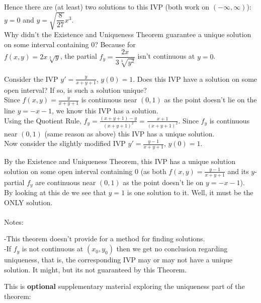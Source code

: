 \documentclass{ximera}
\begin{document}
 Hence there are (at least) two solutions to this IVP (both work on $(-\infty,\infty)$):\\ 
 $y=0$ and $\displaystyle y=\sqrt{\dfrac{8}{27}}x^{3}.$\\


 Why didn't the Existence and Uniqueness Theorem guarantee a unique solution on some interval containing $0$?  Because for\\ $f(x,y)=2x\sqrt[3]{y}$, the partial $f_{y}=\dfrac{2x}{3\sqrt[3]{y^{2}}}$ isn't continuous at $y=0$.


 Consider the IVP $\displaystyle y'=\frac{y}{x+y+1}$, $y(0)=1$.   Does this IVP have a solution on some open interval?  If so, is such a solution unique?\\

 Since $\displaystyle f(x,y)=\frac{y}{x+y+1}$ is continuous near $(0,1)$  as the point doesn't lie on the line $y=-x-1$,  we know this IVP has a solution.\\

 Using the Quotient Rule, $\displaystyle f_y=\frac{(x+y+1)-y}{(x+y+1)^2}=\frac{x+1}{(x+y+1)^2}$.   Since $f_y$ is continuous near $(0,1)$ (same reason as above)  this IVP has a unique solution.\\


 Now consider the slightly modified IVP $\displaystyle y'=\frac{y-1}{x+y+1}$, $y(0)=1$.

 By the Existence and Uniqueness Theorem, this IVP has a unique solution solution on some open interval containing $0$ (as both $f(x,y)=\frac{y-1}{x+y+1}$ and its $y$-partial $f_y$ are continuous near $(0,1)$ as the point doesn't lie on $y=-x-1$).\\  

 By looking at this de we see that $y=1$ is one solution to it.  Well, it must be the ONLY solution.\\ \\  

 Notes: 

-This theorem doesn't provide for a method for finding solutions.\\

-If $f_y$ is not continuous at $(x_0,y_0)$ then we get no conclusion regarding uniqueness, that is, the corresponding IVP may or may not have a unique solution.  It might, but its not guaranteed by this Theorem.


\newpage

This is \textbf{optional} supplementary material exploring the uniqueness part of the theorem:\\
\end{document}
